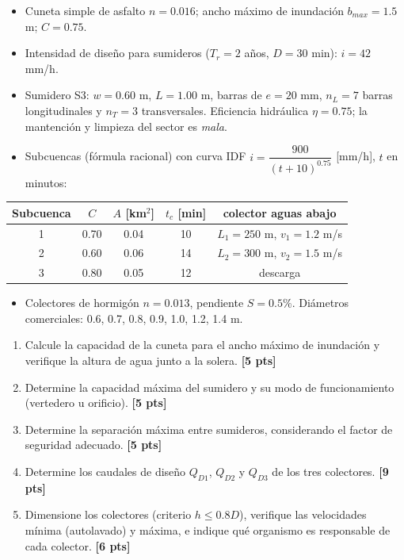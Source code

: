 \documentclass[11pt,letterpaper]{article}
\newcommand{\pts}[1]{\hfill\textbf{[#1 pts]}}
\begin{document}
\begin{dato}[title=Datos]
\begin{itemize}[leftmargin=*,noitemsep]
\item Cuneta simple de asfalto $n=0.016$; ancho máximo de inundación $b_{max}=1.5$ m; $C=0.75$.
\item Intensidad de diseño para sumideros ($T_r=2$ años, $D=30$ min): $i=42$ mm/h.
\item Sumidero S3: $w=0.60$ m, $L=1.00$ m, barras de $e=20$ mm, $n_L=7$ barras longitudinales y $n_T=3$ transversales.
      Eficiencia hidráulica $\eta=0.75$; la mantención y limpieza del sector es \emph{mala}.
\item Subcuencas (fórmula racional) con curva IDF $i=\dfrac{900}{(t+10)^{0.75}}$ [mm/h], $t$ en minutos:
\end{itemize}
\begin{center}
\begin{tabular}{ccccc}
\toprule
Subcuenca & $C$ & $A$ [km$^2$] & $t_c$ [min] & colector aguas abajo\\
\midrule
1 & 0.70 & 0.04 & 10 & $L_1=250$ m, $v_1=1.2$ m/s\\
2 & 0.60 & 0.06 & 14 & $L_2=300$ m, $v_2=1.5$ m/s\\
3 & 0.80 & 0.05 & 12 & descarga\\
\bottomrule
\end{tabular}
\end{center}
\begin{itemize}[leftmargin=*,noitemsep]
\item Colectores de hormigón $n=0.013$, pendiente $S=0.5\%$. Diámetros comerciales: 0.6, 0.7, 0.8, 0.9, 1.0, 1.2, 1.4 m.
\end{itemize}
\end{dato}

\begin{enumerate}[label=\alph*)]
\item Calcule la capacidad de la cuneta para el ancho máximo de inundación y verifique la altura de agua junto a la solera. \pts{5}
\item Determine la capacidad máxima del sumidero y su modo de funcionamiento (vertedero u orificio). \pts{5}
\item Determine la separación máxima entre sumideros, considerando el factor de seguridad adecuado. \pts{5}
\item Determine los caudales de diseño $Q_{D1}$, $Q_{D2}$ y $Q_{D3}$ de los tres colectores. \pts{9}
\item Dimensione los colectores (criterio $h\le0.8D$), verifique las velocidades mínima (autolavado) y máxima, e indique qué organismo es responsable de cada colector. \pts{6}
\end{enumerate}
\end{document}

